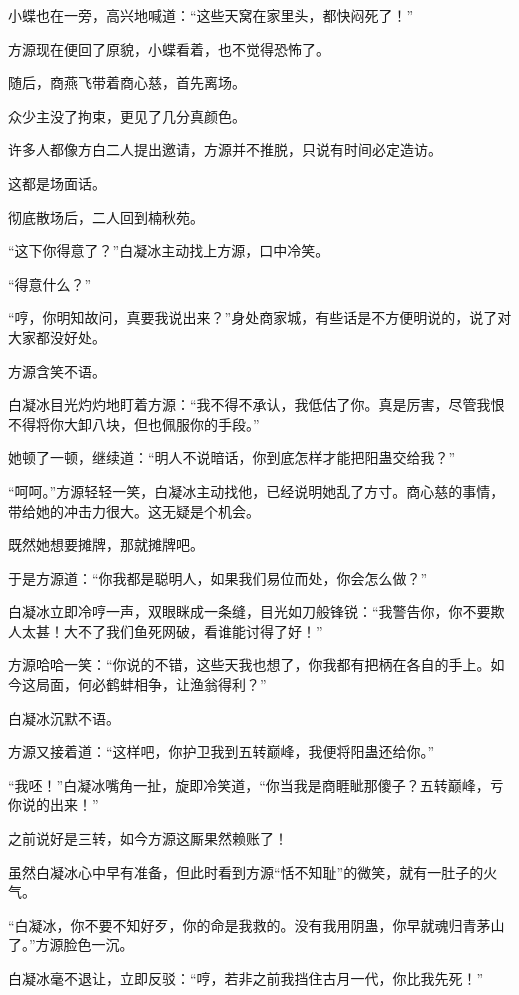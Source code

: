 \begin{this_body}
小蝶也在一旁，高兴地喊道：“这些天窝在家里头，都快闷死了！”

方源现在便回了原貌，小蝶看着，也不觉得恐怖了。

随后，商燕飞带着商心慈，首先离场。

众少主没了拘束，更见了几分真颜色。

许多人都像方白二人提出邀请，方源并不推脱，只说有时间必定造访。

这都是场面话。

彻底散场后，二人回到楠秋苑。

“这下你得意了？”白凝冰主动找上方源，口中冷笑。

“得意什么？”

“哼，你明知故问，真要我说出来？”身处商家城，有些话是不方便明说的，说了对大家都没好处。

方源含笑不语。

白凝冰目光灼灼地盯着方源：“我不得不承认，我低估了你。真是厉害，尽管我恨不得将你大卸八块，但也佩服你的手段。”

她顿了一顿，继续道：“明人不说暗话，你到底怎样才能把阳蛊交给我？”

“呵呵。”方源轻轻一笑，白凝冰主动找他，已经说明她乱了方寸。商心慈的事情，带给她的冲击力很大。这无疑是个机会。

既然她想要摊牌，那就摊牌吧。

于是方源道：“你我都是聪明人，如果我们易位而处，你会怎么做？”

白凝冰立即冷哼一声，双眼眯成一条缝，目光如刀般锋锐：“我警告你，你不要欺人太甚！大不了我们鱼死网破，看谁能讨得了好！”

方源哈哈一笑：“你说的不错，这些天我也想了，你我都有把柄在各自的手上。如今这局面，何必鹤蚌相争，让渔翁得利？”

白凝冰沉默不语。

方源又接着道：“这样吧，你护卫我到五转巅峰，我便将阳蛊还给你。”

“我呸！”白凝冰嘴角一扯，旋即冷笑道，“你当我是商睚眦那傻子？五转巅峰，亏你说的出来！”

之前说好是三转，如今方源这厮果然赖账了！

虽然白凝冰心中早有准备，但此时看到方源“恬不知耻”的微笑，就有一肚子的火气。

“白凝冰，你不要不知好歹，你的命是我救的。没有我用阴蛊，你早就魂归青茅山了。”方源脸色一沉。

白凝冰毫不退让，立即反驳：“哼，若非之前我挡住古月一代，你比我先死！”


\end{this_body}
